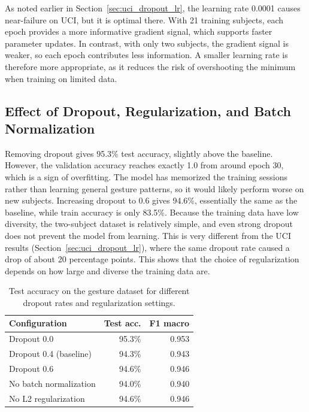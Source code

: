 As noted earlier in Section~\ref{sec:uci_dropout_lr}, the learning rate 0.0001 causes near-failure on UCI, but it is optimal there. With 21 training subjects, each epoch provides a more informative gradient signal, which supports faster parameter updates. In contrast, with only two subjects, the gradient signal is weaker, so each epoch contributes less information. A smaller learning rate is therefore more appropriate, as it reduces the risk of overshooting the minimum when training on limited data.

\subsection{Effect of Dropout, Regularization, and Batch Normalization}
\label{sec:gesture_reg}

Removing dropout gives 95.3\% test accuracy, slightly above the baseline. However, the validation accuracy reaches exactly 1.0 from around epoch 30, which is a sign of overfitting. The model has memorized the training sessions rather than learning general gesture patterns, so it would likely perform worse on new subjects. Increasing dropout to 0.6 gives 94.6\%, essentially the same as the baseline, while train accuracy is only 83.5\%. Because the training data have low diversity, the two-subject dataset is relatively simple, and even strong dropout does not prevent the model from learning. This is very different from the UCI results (Section~\ref{sec:uci_dropout_lr}), where the same dropout rate caused a drop of about 20 percentage points. This shows that the choice of regularization depends on how large and diverse the training data are.

\begin{table}[ht]
  \centering
  \caption{Test accuracy on the gesture dataset for different dropout rates and regularization settings. }
  \label{tab:gesture_dropout}
  \begin{tabular}{lrr}
    \toprule
    \textbf{Configuration} & \textbf{Test acc.} & \textbf{F1 macro} \\
    \midrule
    Dropout 0.0              & 95.3\% & 0.953 \\
    Dropout 0.4 (baseline)   & 94.3\% & 0.943 \\
    Dropout 0.6              & 94.6\% & 0.946 \\
    \addlinespace
    No batch normalization   & 94.0\% & 0.940 \\
    No L2 regularization     & 94.6\% & 0.946 \\
    \bottomrule
  \end{tabular}
\end{table}

